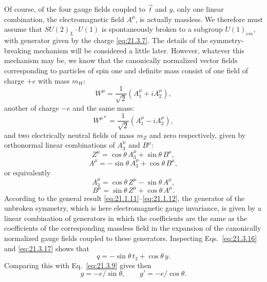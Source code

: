 Of course, of the four gauge fields coupled to $\vec t$ and $y$, only one linear combination, the electromagnetic field $A^\mu$, is actually massless. We therefore must assume that $SU(2)_L\cdot U(1)$ is spontaneously broken to a subgroup $U(1)_{em}$, with generator given by the charge \eqref{eq:21.3.7}. The details of the symmetry-breaking mechanism will be considered a little later. However, whatever this mechanism may be, we know that the canonically normalized vector fields corresponding to particles of spin one and definite mass consist of one field of charge $+e$ with mass $m_W$:
\begin{equation}
W^\mu=\frac{1}{\sqrt{2}}\left(A_1^\mu+iA_2^\mu\right),
\tag{21.3.12}\label{eq:21.3.12}
\end{equation}
another of charge $-e$ and the same mass:
\begin{equation}
W^{\mu *}=\frac{1}{\sqrt{2}}\left(A_1^\mu-iA_2^\mu\right),
\tag{21.3.13}\label{eq:21.3.13}
\end{equation}
and two electrically neutral fields of mass $m_Z$ and zero respectively, given by orthonormal linear combinations of $A_3^\mu$ and $B^\mu$:
\begin{equation}
Z^\mu=\cos\theta\,A_3^\mu+\sin\theta\,B^\mu,
\tag{21.3.14}\label{eq:21.3.14}
\end{equation}
\begin{equation}
A^\mu=-\sin\theta\,A_3^\mu+\cos\theta\,B^\mu,
\tag{21.3.15}\label{eq:21.3.15}
\end{equation}
or equivalently
\begin{equation}
A_3^\mu=\cos\theta\,Z^\mu-\sin\theta\,A^\mu,
\tag{21.3.16}\label{eq:21.3.16}
\end{equation}
\begin{equation}
B^\mu=\sin\theta\,Z^\mu+\cos\theta\,A^\mu.
\tag{21.3.17}\label{eq:21.3.17}
\end{equation}
According to the general result \eqref{eq:21.1.11}--\eqref{eq:21.1.12}, the generator of the unbroken symmetry, which is here electromagnetic gauge invariance, is given by a linear combination of generators in which the coefficients are the same as the coefficients of the corresponding massless field in the expansion of the canonically normalized gauge fields coupled to these generators. Inspecting Eqs.~\eqref{eq:21.3.16} and \eqref{eq:21.3.17} shows that
\begin{equation}
q=-\sin\theta\,t_3+\cos\theta\,y.
\tag{21.3.18}\label{eq:21.3.18}
\end{equation}
Comparing this with Eq.~\eqref{eq:21.3.9} gives then
\begin{equation}
g=-e/\sin\theta,
\qquad
g'=-e/\cos\theta.
\tag{21.3.19}\label{eq:21.3.19}
\end{equation}

